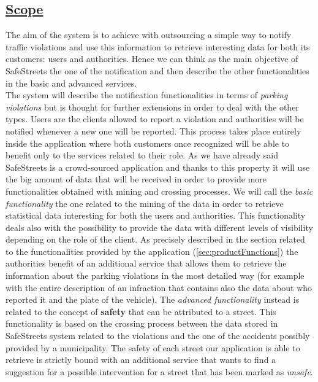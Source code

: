 \subsection[Scope]{\hyperlink{toc}{Scope}}
	The aim of the system is to achieve with outsourcing a simple way to notify traffic violations and use this information to retrieve interesting data for both its customers: users and authorities. Hence we can think as the main objective of SafeStreets the one of the notification and then describe the other functionalities in the basic and advanced services.\\
	
	The system will describe the notification functionalities in terms of \emph{parking violations} but is thought for further extensions in order to deal with the other types. Users are the clients allowed to report a violation and authorities will be notified whenever a new one will be reported. This process takes place entirely inside the application where both customers once recognized will be able to benefit only to the services related to their role. As we have already said SafeStreets is a crowd-sourced application and thanks to this property it will use the big amount of data that will be received in order to provide more functionalities obtained with mining and crossing processes. We will call the \emph{basic functionality} the one related to the mining of the data in order to retrieve statistical data interesting for both the users and authorities. This functionality deals also with the possibility to provide the data with different levels of visibility depending on the role of the client. As precisely described in the section related to the functionalities provided by the application (\ref{sec:productFunctions}) the authorities benefit of an additional service that allows them to retrieve the information about the parking violations in the most detailed way (for example with the entire description of an infraction that contains also the data about who reported it and the plate of the vehicle). The \emph{advanced functionality} instead is related to the concept of \textbf{safety} that can be attributed to a street. This functionality is based on the crossing process between the data stored in SafeStreets system related to the violations and the one of the accidents possibly provided by a municipality. The safety of each street our application is able to retrieve is strictly bound with an additional service that wants to find a suggestion for a possible intervention for a street that has been marked as \emph{unsafe}.\\
	
